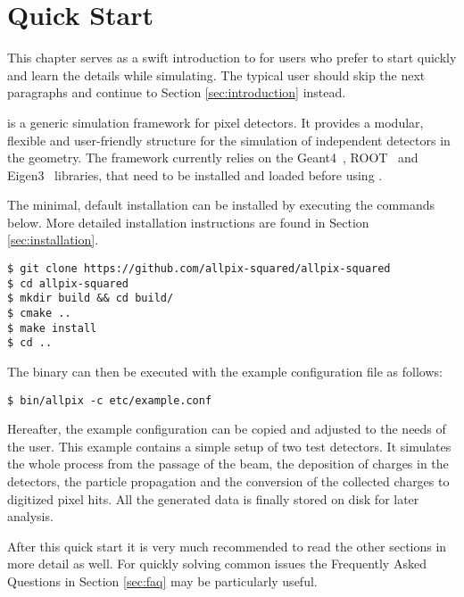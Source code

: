 \section{Quick Start}
This chapter serves as a swift introduction to \apsq for users who prefer to start quickly and learn the details while simulating. The typical user should skip the next paragraphs and continue to Section \ref{sec:introduction} instead.

\apsq is a generic simulation framework for pixel detectors. It provides a modular, flexible and user-friendly structure for the simulation of independent detectors in the geometry. The framework currently relies on the Geant4~\cite{geant4}, ROOT~\cite{root} and Eigen3~\cite{eigen3} libraries, that need to be installed and loaded before using \apsq.

The minimal, default installation can be installed by executing the commands below. More detailed installation instructions are found in Section \ref{sec:installation}.
\begin{verbatim}
$ git clone https://github.com/allpix-squared/allpix-squared
$ cd allpix-squared
$ mkdir build && cd build/
$ cmake ..
$ make install
$ cd ..
\end{verbatim}
The binary can then be executed with the example configuration file as follows:
\begin{verbatim}
$ bin/allpix -c etc/example.conf
\end{verbatim}

Hereafter, the example configuration can be copied and adjusted to the needs of the user. This example contains a simple setup of two test detectors. It simulates the whole process from the passage of the beam, the deposition of charges in the detectors, the particle propagation and the conversion of the collected charges to digitized pixel hits. All the generated data is finally stored on disk for later analysis.

After this quick start it is very much recommended to read the other sections in more detail as well. For quickly solving common issues the Frequently Asked Questions in Section \ref{sec:faq} may be particularly useful.
